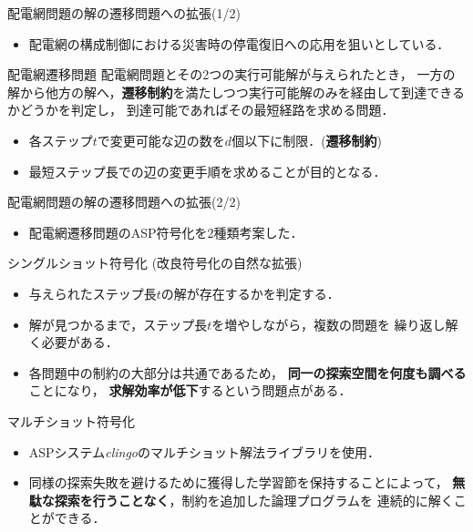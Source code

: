 \documentclass[dvipdfmx,11pt]{beamer}
\newcommand{\code}[1]{\lstinline[basicstyle=\ttfamily]{#1}}
\begin{document}
\begin{frame}{配電網問題の解の遷移問題への拡張(1/2)}
 \begin{itemize}
  \item 配電網の構成制御における災害時の停電復旧への応用を狙いとしている．
 \end{itemize}
 \begin{block}{配電網遷移問題}
  配電網問題とその2つの実行可能解が与えられたとき，
  一方の解から他方の解へ，\alert{\bf 遷移制約}を満たしつつ実行可能解のみを経由して到達できるかどうかを判定し，
  到達可能であればその最短経路を求める問題．
  \begin{itemize}
  \item 各ステップ$t$で変更可能な辺の数を$d$個以下に制限．(\textbf{遷移制約})
  \item 最短ステップ長での辺の変更手順を求めることが目的となる．
  \end{itemize}
 \end{block} 
\end{frame}
\begin{frame}{配電網問題の解の遷移問題への拡張(2/2)}
 \begin{itemize}
  \item 配電網遷移問題のASP符号化を2種類考案した．
 \end{itemize}
 \begin{block}{シングルショット符号化 (改良符号化の自然な拡張)}
    \begin{itemize}
    \item 与えられたステップ長$t$の解が存在するかを判定する．
    \item 解が見つかるまで，ステップ長$t$を増やしながら，複数の問題を
      繰り返し解く必要がある．
    \item 各問題中の制約の大部分は共通であるため，
      \textbf{同一の探索空間を何度も調べる}ことになり，
      \textbf{求解効率が低下}するという問題点がある．
  \end{itemize}
 \end{block}
 \vfill
 \begin{alertblock}{マルチショット符号化}
   \begin{itemize}
   \item ASPシステム\textit{clingo}のマルチショット解法ライブラリを使用．
   \item 同様の探索失敗を避けるために獲得した学習節を保持することによって，
		 \textbf{無駄な探索を行うことなく}，制約を追加した論理プログラムを
		 連続的に解くことができる．
  \end{itemize}
 \end{alertblock}
\end{frame}
\end{document}
